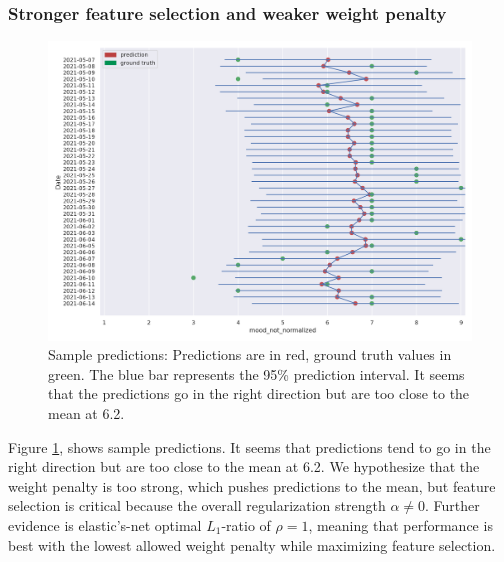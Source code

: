 \documentclass[conference]{IEEEtran}
\begin{document}
\subsubsection{Stronger feature selection and weaker weight penalty}
\begin{figure}[htbp]
\begin{center}
\includegraphics[width=1\linewidth]{figs/example.png}
\caption{Sample predictions: Predictions are in red, ground truth values in green. The blue bar represents the 95\% prediction interval. It seems that the predictions go in the right direction but are too close to the mean at 6.2.}
\label{fig:prediction-results}
\end{center}
\end{figure}
Figure \ref{fig:prediction-results}, shows sample predictions. It seems that predictions tend to go in the right direction but are too close to the mean at 6.2. We hypothesize that the weight penalty is too strong, which pushes predictions to the mean, but feature selection is critical because the overall regularization strength $\alpha \neq0$.
Further evidence is elastic's-net optimal $L_1$-ratio of $\rho=1$, meaning that performance is best with the lowest allowed weight penalty while maximizing feature selection. 
\end{document}

